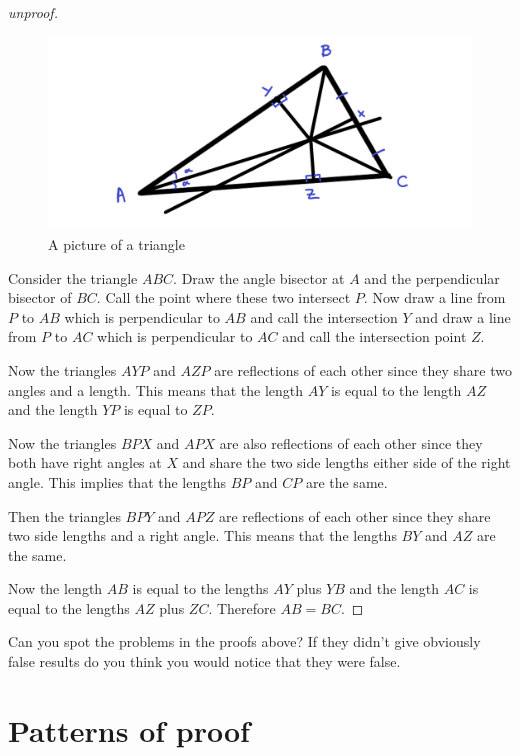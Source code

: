 \documentclass[
]{book}
\theoremstyle{definition}
\theoremstyle{definition}
\theoremstyle{definition}
\theoremstyle{definition}
\theoremstyle{remark}
\begin{document}
\begin{proof}[unproof]

\begin{figure}
\centering
\includegraphics{badtriangle.png}
\caption{\label{fig:unnamed-chunk-27}A picture of a triangle}
\end{figure}

Consider the triangle \(ABC\). Draw the angle bisector at \(A\) and the perpendicular bisector of \(BC\). Call the point where these two intersect \(P\). Now draw a line from \(P\) to \(AB\) which is perpendicular to \(AB\) and call the intersection \(Y\) and draw a line from \(P\) to \(AC\) which is perpendicular to \(AC\) and call the intersection point \(Z\).

Now the triangles \(AYP\) and \(AZP\) are reflections of each other since they share two angles and a length. This means that the length \(AY\) is equal to the length \(AZ\) and the length \(YP\) is equal to \(ZP\).

Now the triangles \(BPX\) and \(APX\) are also reflections of each other since they both have right angles at \(X\) and share the two side lengths either side of the right angle. This implies that the lengths \(BP\) and \(CP\) are the same.

Then the triangles \(BPY\) and \(APZ\) are reflections of each other since they share two side lengths and a right angle. This means that the lengths \(BY\) and \(AZ\) are the same.

Now the length \(AB\) is equal to the lengths \(AY\) plus \(YB\) and the length \(AC\) is equal to the lengths \(AZ\) plus \(ZC\). Therefore \(AB = BC\).

\end{proof}

Can you spot the problems in the proofs above? If they didn't give obviously false results do you think you would notice that they were false.

\section{Patterns of proof}\label{patterns-of-proof}
\end{document}
